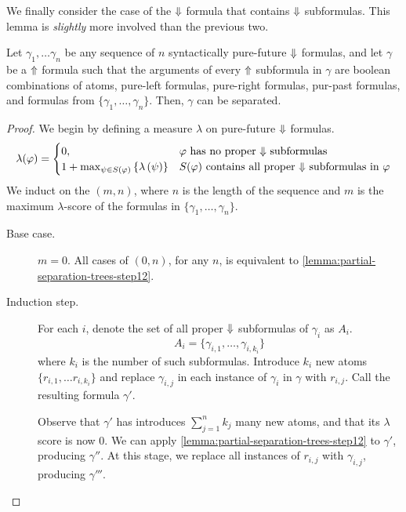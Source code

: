 \documentclass[a4paper,UKenglish,cleveref, autoref, thm-restate, numberwithinsect]{lipics-v2021}
\def\Uarrow{\ensuremath\mathord{\Uparrow}}
\def\Darrow{\ensuremath\mathord{\Downarrow}}
\begin{document}
We finally consider the case of the $\Darrow$ formula that contains $\Darrow$ subformulas. This lemma is \textit{slightly} more involved than the previous two.
\begin{lemma}
    \label{lemma:partial-separation-trees-step13}
    Let $\gamma_1, \ldots \gamma_n$ be any sequence of $n$ syntactically pure-future $\Darrow$ formulas, and let $\gamma$ be a $\Uarrow$ formula such that the arguments of every $\Uarrow$ subformula in $\gamma$ are boolean combinations of atoms, pure-left formulas, pure-right formulas, pur-past formulas, and formulas from $\{\gamma_1, \ldots, \gamma_n\}$. Then, $\gamma$ can be separated.
\end{lemma}
\begin{proof}
    We begin by defining a measure $\lambda$ on pure-future $\Darrow$ formulas.
    \begin{equation*}
        \lambda(\varphi) = \begin{cases}
            0, & \text{$\varphi$ has no proper $\Darrow$ subformulas}\\
            1 + \max_{\psi \in S(\varphi)} \left\{\lambda\left(\psi\right)\right\} & \text{$S(\varphi)$ contains all proper $\Darrow$ subformulas in $\varphi$}
        \end{cases}
    \end{equation*}
    We induct on the $(m, n)$, where $n$ is the length of the sequence and $m$ is the maximum $\lambda$-score of the formulas in $\{\gamma_1, \ldots, \gamma_n\}$.

    \begin{description}
        \item[Base case.] $m = 0$. All cases of $(0, n)$, for any $n$, is equivalent to \cref{lemma:partial-separation-trees-step12}.
        \item[Induction step.] For each $i$, denote the set of all proper $\Darrow$ subformulas of $\gamma_i$ as $A_i$.
        \begin{equation*}
            A_i = \{ \gamma_{i, 1}, \ldots, \gamma_{i, k_i} \}
        \end{equation*}
        where $k_i$ is the number of such subformulas. Introduce $k_i$ new atoms $\{r_{i, 1}, \ldots r_{i, k_i}\}$ and replace $\gamma_{i, j}$ in each instance of $\gamma_i$ in $\gamma$ with $r_{i, j}$. Call the resulting formula $\gamma'$.

        Observe that $\gamma'$ has introduces $\sum_{j = 1}^{n} k_j$ many new atoms, and that its $\lambda$ score is now 0. We can apply \cref{lemma:partial-separation-trees-step12} to $\gamma'$, producing $\gamma''$. At this stage, we replace all instances of $r_{i, j}$ with $\gamma_{i, j}$, producing $\gamma'''$.


\end{description}
\end{proof}
\end{document}
